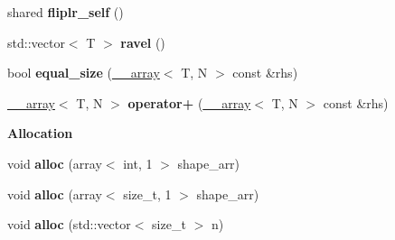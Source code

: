 \begin{DoxyCompactItemize}
\item 
\hypertarget{class____array_a9de6105d23a33b20a4b0cc02b923edb4}{
shared {\bfseries fliplr\_\-self} ()}
\label{class____array_a9de6105d23a33b20a4b0cc02b923edb4}

\item 
\hypertarget{class____array_a07f72930f0260b81df31b991f4c7e97d}{
std::vector$<$ T $>$ {\bfseries ravel} ()}
\label{class____array_a07f72930f0260b81df31b991f4c7e97d}

\item 
\hypertarget{class____array_accc02e65ce775d472554778825ebdeda}{
bool {\bfseries equal\_\-size} (\hyperlink{class____array}{\_\-\_\-array}$<$ T, N $>$ const \&rhs)}
\label{class____array_accc02e65ce775d472554778825ebdeda}

\item 
\hypertarget{class____array_a435566ff4cab00684e41335595b4c60c}{
\hyperlink{class____array}{\_\-\_\-array}$<$ T, N $>$ {\bfseries operator+} (\hyperlink{class____array}{\_\-\_\-array}$<$ T, N $>$ const \&rhs)}
\label{class____array_a435566ff4cab00684e41335595b4c60c}

\end{DoxyCompactItemize}
\begin{Indent}{\bf Allocation}\par
{\em \label{_amgrp27c0ad7a8ff8f9df8e13bb2d974c95d0}
 }\begin{DoxyCompactItemize}
\item 
\hypertarget{class____array_a8a0f0e9f3af8384c29ddd21d3451b65e}{
void {\bfseries alloc} (array$<$ int, 1 $>$ shape\_\-arr)}
\label{class____array_a8a0f0e9f3af8384c29ddd21d3451b65e}

\item 
\hypertarget{class____array_a5e6bcbf0f6da1f52d3bb40e5671ae249}{
void {\bfseries alloc} (array$<$ size\_\-t, 1 $>$ shape\_\-arr)}
\label{class____array_a5e6bcbf0f6da1f52d3bb40e5671ae249}

\item 
\hypertarget{class____array_a96e39e536340b61efb3c148347ebd4ee}{
void {\bfseries alloc} (std::vector$<$ size\_\-t $>$ n)}
\label{class____array_a96e39e536340b61efb3c148347ebd4ee}

\end{DoxyCompactItemize}
\end{Indent}
